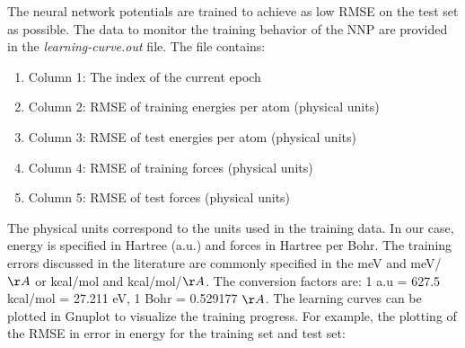 \documentclass[12pt]{article}
\begin{document}
The neural network potentials are trained to achieve as low RMSE on the test set as possible. The data to monitor the training behavior of the NNP are provided in the \textit{learning-curve.out} file. The file contains:
\begin{enumerate}
    \item Column 1: The index of the current epoch
    \item Column 2: RMSE of training energies per atom (physical units)
    \item Column 3: RMSE of test energies per atom (physical units)
    \item Column 4: RMSE of training forces (physical units)
    \item Column 5: RMSE of test forces (physical units)
\end{enumerate}

 The physical units correspond to the units used in the training data. In our case, energy is specified in Hartree (a.u.) and forces in Hartree per Bohr. The training errors discussed in the literature are commonly specified in the meV and meV/$\AA$ or kcal/mol and kcal/mol/$\AA$. The conversion factors are: 1 a.u = 627.5 kcal/mol = 27.211 eV, 1 Bohr = 0.529177 $\AA$. The learning curves can be plotted in Gnuplot to visualize the training progress. For example, the plotting of the RMSE in error in energy for the training set and test set:

\begin{center}
\end{center}
\end{document}
